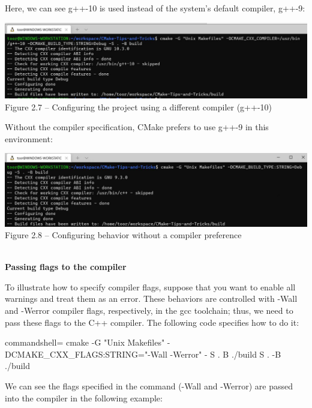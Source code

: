 Here, we can see g++-10 is used instead of the system's default compiler, g++-9:

\begin{center}
\includegraphics[width=1.\textwidth]{content/1/chapter2/images/7.jpg}\\
Figure 2.7 – Configuring the project using a different compiler (g++-10)
\end{center}

Without the compiler specification, CMake prefers to use g++-9 in this environment:

\begin{center}
\includegraphics[width=1.\textwidth]{content/1/chapter2/images/8.jpg}\\
Figure 2.8 – Configuring behavior without a compiler preference
\end{center}

\hspace*{\fill} \\ %
\noindent
\textbf{Passing flags to the compiler}

To illustrate how to specify compiler flags, suppose that you want to enable all warnings and treat them as an error. These behaviors are controlled with -Wall and -Werror compiler flags, respectively, in the gcc toolchain; thus, we need to pass these flags to the C++ compiler. The following code specifies how to do it:

\begin{tcblisting}{commandshell={}}
cmake -G "Unix Makefiles" -DCMAKE_CXX_FLAGS:STRING="-Wall
  -Werror" - S . B ./build S . -B ./build
\end{tcblisting}

We can see the flags specified in the command (-Wall and -Werror) are passed into the compiler in the following example:

